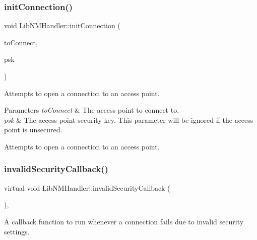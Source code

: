 \subsubsection{\texorpdfstring{init\+Connection()}{initConnection()}}
{\footnotesize\ttfamily void Lib\+N\+M\+Handler\+::init\+Connection (\begin{DoxyParamCaption}\item[{\mbox{\hyperlink{classWifiAccessPoint_ad18977f884076774803027efbaa131a0}{Wifi\+Access\+Point\+::\+Ptr}}}]{to\+Connect,  }\item[{String}]{psk }\end{DoxyParamCaption})\hspace{0.3cm}{\ttfamily [protected]}}

Attempts to open a connection to an access point.


\begin{DoxyParams}{Parameters}
{\em to\+Connect} & The access point to connect to.\\
\hline
{\em psk} & The access point security key. This parameter will be ignored if the access point is unsecured.\\
\hline
\end{DoxyParams}
Attempts to open a connection to an access point. \mbox{\label{classLibNMHandler_ab6cd6eaa5bb09fd4991893176e40c00a}} 
\subsubsection{\texorpdfstring{invalid\+Security\+Callback()}{invalidSecurityCallback()}}
{\footnotesize\ttfamily virtual void Lib\+N\+M\+Handler\+::invalid\+Security\+Callback (\begin{DoxyParamCaption}{ }\end{DoxyParamCaption})\hspace{0.3cm}{\ttfamily [protected]}, {}}

A callback function to run whenever a connection fails due to invalid security settings. \mbox{\label{classLibNMHandler_a2b022c92983f1e4791008082e8d4cf65}} 
